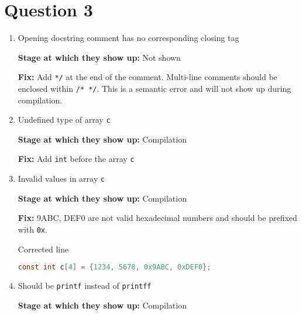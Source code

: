 \section*{Question 3}



\begin{enumerate}

    \item Opening docstring comment has no corresponding closing tag

          \textbf{Stage at which they show up:}
          Not shown

          \textbf{Fix:}
          Add \texttt{*/} at the end of the comment.
          Multi-line comments should be enclosed within \texttt{/* */}.
          This is a semantic error and will not show up during compilation.

    \item Undefined type of array \texttt{c}

          \textbf{Stage at which they show up:}
          Compilation

          \textbf{Fix:}
          Add \texttt{int} before the array \texttt{c}

    \item Invalid values in array \texttt{c}

          \textbf{Stage at which they show up:}
          Compilation

          \textbf{Fix:}
          9ABC, DEF0 are not valid hexadecimal numbers and should be prefixed with \texttt{0x}.

          Corrected line
          \begin{lstlisting}[language=C, frame=single]
const int c[4] = {1234, 5678, 0x9ABC, 0xDEF0};
            \end{lstlisting}

    \item Should be \texttt{printf} instead of \texttt{printff}

          \textbf{Stage at which they show up:}
          Compilation

\end{enumerate}
